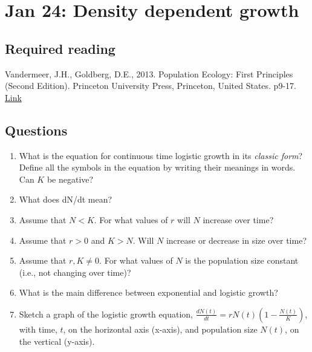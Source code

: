 \documentclass[
]{book}
\begin{document}
\hypertarget{dd}{%
\chapter{Jan 24: Density dependent growth}\label{dd}}

\hypertarget{required-reading-1}{%
\section{Required reading}\label{required-reading-1}}

Vandermeer, J.H., Goldberg, D.E., 2013. Population Ecology: First Principles (Second Edition). Princeton University Press, Princeton, United States. p9-17. \href{https://ebookcentral-proquest-com.qe2a-proxy.mun.ca/lib/mun/detail.action?docID=1205619}{Link}

\hypertarget{questions-2}{%
\section{Questions}\label{questions-2}}

\begin{enumerate}
\def\labelenumi{\arabic{enumi}.}
\item
  What is the equation for continuous time logistic growth in its \emph{classic form}? Define all the symbols in the equation by writing their meanings in words. Can \(K\) be negative?
\item
  What does dN/dt mean?
\item
  Assume that \(N < K\). For what values of \(r\) will \(N\) increase over time?
\item
  Assume that \(r > 0\) and \(K > N\). Will \(N\) increase or decrease in size over time?
\item
  Assume that \(r,K \neq 0\). For what values of \(N\) is the population size constant (i.e., not changing over time)?
\item
  What is the main difference between exponential and logistic growth?
\item
  Sketch a graph of the logistic growth equation, \(\frac{dN(t)}{dt} = rN(t)\left(1 - \frac{N(t)}{K}\right)\), with time, \(t\), on the horizontal axis (x-axis), and population size \(N(t)\), on the vertical (y-axis).
\end{enumerate}
\end{document}

